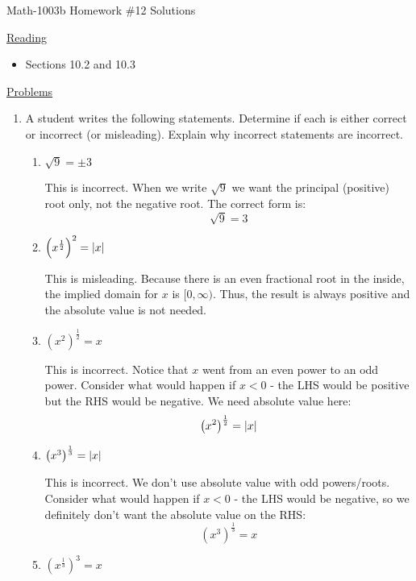 \documentclass[letterpaper,12pt,fleqn]{article}
\begin{document}
\begin{center}
\Large Math-1003b Homework \#12 Solutions
\end{center}

\vspace{0.5in}

\underline{Reading}

\bigskip

\begin{itemize}
\item Sections 10.2 and 10.3
\end{itemize}

\bigskip

\underline{Problems}

\bigskip

\begin{enumerate}
\item A student writes the following statements. Determine if each is either
correct or incorrect (or misleading). Explain why incorrect statements are
incorrect.
\begin{enumerate}
\item $\sqrt{9}=\pm3$

  This is incorrect. When we write $\sqrt{9}$ we want the principal (positive) root
  only, not the negative root. The correct form is:
  \[\sqrt{9}=3\]
  
\item $\left(x^{\frac{1}{2}}\right)^2=\lvert x\rvert$

  This is misleading. Because there is an even fractional root in the inside, the implied
  domain for $x$ is $[0,\infty)$. Thus, the result is always positive and the absolute
  value is not needed.
    
\item $\left(x^2\right)^{\frac{1}{2}}=x$

  This is incorrect. Notice that $x$ went from an even power to an odd power. Consider
  what would happen if $x<0$ - the LHS would be positive but the RHS would be negative.
  We need absolute value here:
  \[\left(x^2\right)^{\frac{1}{2}}=\lvert x\rvert\]
  
\item $\left(x^3\right)^{\frac{1}{3}}=\lvert x\rvert$

  This is incorrect. We don't use absolute value with odd powers/roots. Consider what
  would happen if $x<0$ - the LHS would be negative, so we definitely don't want the
  absolute value on the RHS:
  \[\left(x^3\right)^{\frac{1}{3}}=x\]
  
\item $\left(x^{\frac{1}{3}}\right)^3=x$


\end{enumerate}
\end{enumerate}
\end{document}
